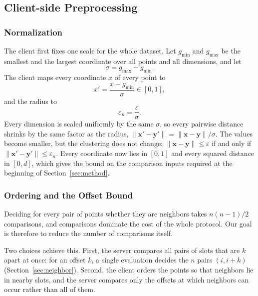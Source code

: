 
\subsection{Client-side Preprocessing}
\label{sec:client}

\subsubsection{Normalization}
The client first fixes one scale for the whole dataset. Let $g_{\min}$
and $g_{\max}$ be the smallest and the largest coordinate over all points
and all dimensions, and let
\[
  \sigma = g_{\max} - g_{\min} .
\]
The client maps every coordinate $x$ of every point to
\[
  x' = \frac{x - g_{\min}}{\sigma} \in [0,1],
\]
and the radius to
\[
  \varepsilon_n = \frac{\varepsilon}{\sigma} .
\]
Every dimension is scaled uniformly by the same $\sigma$, so every
pairwise distance shrinks by the same factor as the radius,
$\|\mathbf{x}' - \mathbf{y}'\| = \|\mathbf{x} - \mathbf{y}\| / \sigma$.
The values become smaller, but the clustering does not change:
$\|\mathbf{x} - \mathbf{y}\| \le \varepsilon$ if and only if
$\|\mathbf{x}' - \mathbf{y}'\| \le \varepsilon_n$. Every coordinate now
lies in $[0,1]$ and every squared distance in $[0,d]$, which gives the
bound on the comparison inputs required at the beginning of
Section~\ref{sec:method}.

\subsubsection{Ordering and the Offset Bound}
Deciding for every pair of points whether they are neighbors takes
$n(n-1)/2$ comparisons, and comparisons dominate the cost of the whole
protocol. Our goal is therefore to reduce the number of comparisons
itself.

Two choices achieve this. First, the server compares all pairs of slots
that are $k$ apart at once: for an offset $k$, a single evaluation
decides the $n$ pairs $(i, i+k)$ (Section~\ref{sec:neighbor}). Second,
the client orders the points so that neighbors lie in nearby slots, and
the server compares only the offsets at which neighbors can occur rather
than all of them.

